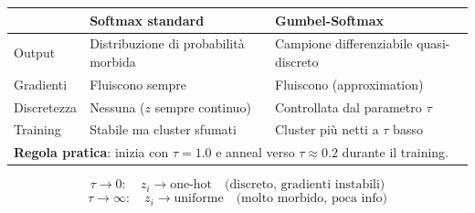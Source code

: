 \documentclass[11pt,a4paper]{article}
\begin{document}
\begin{center}
\renewcommand{\arraystretch}{1.4}
\begin{tabular}{p{3.5cm} p{5cm} p{5cm}}
\toprule
& \textbf{Softmax standard} & \textbf{Gumbel-Softmax}\\
\midrule
Output & Distribuzione di probabilità morbida & Campione differenziabile quasi-discreto\\
Gradienti & Fluiscono sempre & Fluiscono (approximation)\\
Discretezza & Nessuna ($z$ sempre continuo) & Controllata dal parametro $\tau$\\
Training & Stabile ma cluster sfumati & Cluster più netti a $\tau$ basso\\
\midrule
\multicolumn{3}{l}{\textbf{Regola pratica}: inizia con $\tau=1.0$ e anneal verso $\tau\approx0.2$ durante il training.}\\
\bottomrule
\end{tabular}
\end{center}

\[
\tau\to 0: \quad z_i \to \text{one-hot} \quad\text{(discreto, gradienti instabili)}
\]
\[
\tau\to\infty: \quad z_i \to \text{uniforme} \quad\text{(molto morbido, poca info)}
\]
\end{document}
